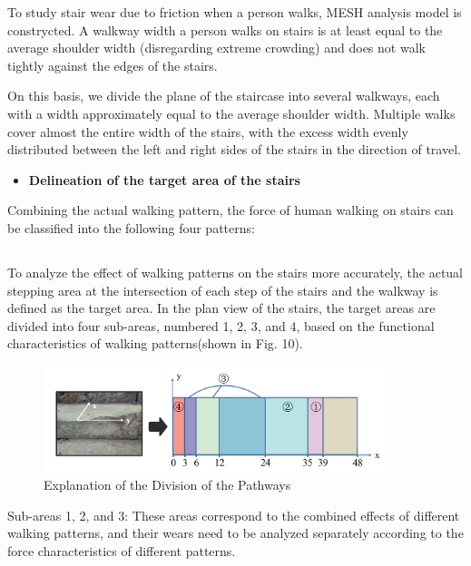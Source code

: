 \documentclass{mcmthesis}
\begin{document}
To study stair wear due to friction when a person walks, MESH analysis model is constrycted. A walkway width a person walks on stairs is at least equal to the average shoulder width (disregarding extreme crowding) and does not walk tightly against the edges of the stairs. 

On this basis, we divide the plane of the staircase into several walkways, each with a width approximately equal to the average shoulder width. Multiple walks cover almost the entire width of the stairs, with the excess width evenly distributed between the left and right sides of the stairs in the direction of travel.
\begin{itemize}[label=$\diamond$]
\item \textbf{Delineation of the target area of the stairs}
\end{itemize}

Combining the actual walking pattern, the force of human walking on stairs can be classified into the following four patterns:




\subsection{}

To analyze the effect of walking patterns on the stairs more accurately, the actual stepping area at the intersection of each step of the stairs and the walkway is defined as the target area. In the plan view of the stairs, the target areas are divided into four sub-areas, numbered 1, 2, 3, and 4, based on the functional characteristics of walking patterns(shown in Fig. 10).

\begin{figure}[h]  %
  \small
  \centering  %
  \includegraphics[width=10cm]{12-Explanation of the Division of the Pathways.png}
  \caption{Explanation of the Division of the Pathways} \label{fig:2}  %
  \end{figure}  %


Sub-areas 1, 2, and 3: These areas correspond to the combined effects of different walking patterns, and their wears need to be analyzed separately according to the force characteristics of different patterns.
\end{document}
